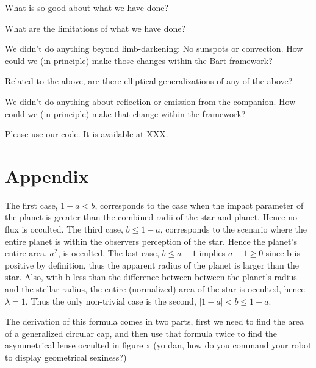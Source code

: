 \documentclass[12pt,preprint]{aastex}
\newcommand{\project}[1]{{\sffamily #1}}
\begin{document}
What is so good about what we have done?

What are the limitations of what we have done?

We didn't do anything beyond limb-darkening:  No sunspots or convection.
How could we (in principle) make those changes within the \project{Bart} framework?

Related to the above, are there elliptical generalizations of any of the above?

We didn't do anything about reflection or emission from the companion.
How could we (in principle) make that change within the framework?

Please use our code.  It is available at XXX.

\acknowledgments

\section{Appendix}

The first case, $1+a < b$, corresponds to the case when the impact parameter of the planet is greater than the combined radii of the star and planet. Hence no flux is occulted.  The third case, $b \leq 1-a$, corresponds to the scenario where the entire planet is within the observers perception of the star.  Hence the planet's entire area, $a^2$, is occulted.  The last case, $b \leq a-1$ implies $a-1 \geq 0$ since b is positive by definition, thus the apparent radius of the planet is larger than the star.  Also, with b less than the difference between between the planet's radius and the stellar radius, the entire (normalized) area of the star is occulted, hence $\lambda = 1$.  Thus the only non-trivial case is the second, $|1-a| < b \leq 1+a$.

The derivation of this formula comes in two parts, first we need to find the area of a generalized circular cap, and then use that formula twice to find the asymmetrical lense occulted in figure x (yo dan, how do you command your robot to display geometrical sexiness?)  

%
\end{document}
